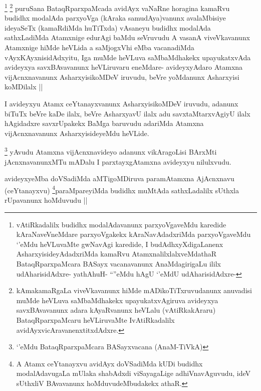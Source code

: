 \begin{artha}
\footnote{vAtiRkadalilx budidhx modalAdavanunx parxyoVgaveMdu karedide kAraNaveVneMdare parxyoVgakekx kAraNavAdadxriMda parxyoVgaveMdu `\stext'eMdu heVLuvaMte gwNavAgi karedide, I budAdhxyXdigaLanenx AsharxyisideyAdadxriMda kamaRvu AtamxnalilxlalxveMdathaR BataqRparxpaMcara BASayx vacanavanunx AnaMdagirigaLu ililx udAharisidAdxre- yathAhuH- ``\stext''eMdu hAgU `\stext'eMdU udAharisidAdxre-}
\footnote{kAmakamaRgaLa viveVkavanunx hiMde mADikoTiTxruvudanunx anuvadisi muMde heVLuva saMbaMdhakekx upayukatxvAgiruva avideyxya savxBAvavanunx adara kAyaRvanunx heVLalu (vAtiRkakAraru) BataqRparxpaMcaru heVLiruvaMte IvAtiRkadalilx avidAyxvicAravanenxtitxdAdxre.}
puruSana BataqRparxpaMcada avidAyx vaNaRne horagina kamaRvu budidhx modalAda parxyoVga (kAraka samudAya)vanunx avalaMbisiye ideyaSeTx (kamaRdiMda huTiTxda) vAsaneyu budidhx modalAda sathxLadiMda Atamxnige edurAgi baMdu seVruvudu A vasanA viveVkavanunx Atamxnige hiMde heVLida a saMjogxVhi eMba vacanadiMda vAyxKAyxnisidAdxyitu, Iga muMde heVLuva saMbaMdhakekx upayukatxvAda avideyxya savxBAvavanunx heVLiruvaru eneMdare- avideyxyAdaro Atamxna vijAcnxnavanunx AsharxyisikoMDeV iruvudu, beVre yoMdanunx Asharxyisi koMDilalx ||
\end{artha}

\begin{artha}
I avideyxyu Atamx ceYtanayxvanunx AsharxyisikoMDeV iruvudu, adanunx biTuTx beVre kaDe ilalx, beVre AsharxyavU ilalx adu savxtaMtarxvAgiyU ilalx hAgidadxre savxrUpakekx BaMga baruvudu adariMda Atamxna vijAcnxnavanunx AsharxyisideyeMdu heVLide.
\end{artha}


\begin{artha}
\footnote{`\stext'eMdu BataqRparxpaMcara BASayxvacana (AnaM-TiVkA)}
yAvudu Atamxna vijAcnxnavideyo adanunx vikAragoLisi BArxMti jAcnxnavanunxMTu mADalu I parxtayxgAtamxna avideyxyu nilulxvudu.
\end{artha}


\begin{artha}
avideyxyeMba doVSadiMda aMTigoMDiruva paramAtamxna AjAcnxnavu (ceYtanayxvu) \footnote{A Atamx ceYtanayxvu avidAyx doVSadiMda kUDi budidhx modalAdavugaLa mUlaka shabAdxdi viSayagaLige adhiVnavAguvudu, ideV sUthxliV BAvavanunx hoMduvudeMbudakekx athaR.}paraMpareyiMda budidhx muMtAda sathxLadalilx sUthxla rUpavanunx hoMduvudu ||
\end{artha}


